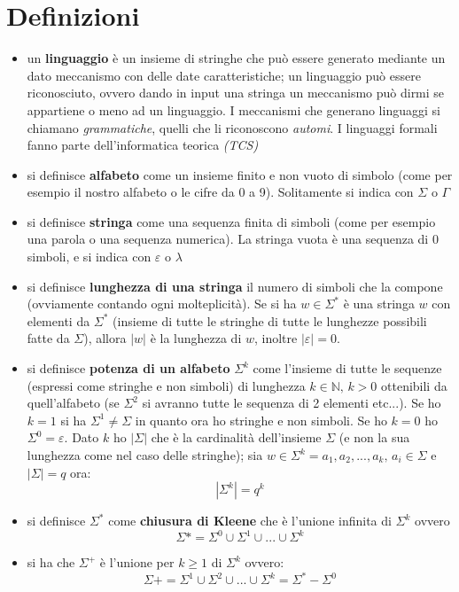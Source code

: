 \documentclass[a4paper,12pt, oneside]{book}
\begin{document}
\section{Definizioni}
\begin{itemize}
\item un \textbf{linguaggio }è un insieme di stringhe che può essere generato mediante un dato meccanismo con delle date caratteristiche; un linguaggio può essere riconosciuto, ovvero dando in input una stringa un meccanismo può dirmi se appartiene o meno ad un linguaggio. I meccanismi che generano linguaggi si chiamano \textit{grammatiche}, quelli che li riconoscono \textit{automi}. I linguaggi formali fanno parte dell'informatica teorica \textit{(TCS)}
\item si definisce \textbf{alfabeto} come un insieme finito e non vuoto di simbolo (come per esempio il nostro alfabeto o le cifre da 0 a 9). Solitamente si indica con $\Sigma$ o $\Gamma$
\item si definisce \textbf{stringa} come una sequenza finita di simboli (come per esempio una parola o una sequenza numerica). La stringa vuota è una sequenza di 0 simboli, e si indica con $\varepsilon$ o $\lambda$
\item si definisce \textbf{lunghezza di una stringa} il numero di simboli che la compone (ovviamente contando ogni molteplicità). Se si ha $w\in \Sigma^*$ è una stringa $w$ con elementi da $\Sigma^*$ (insieme di tutte le stringhe di tutte le lunghezze possibili fatte da $\Sigma$), allora $|w|$ è la lunghezza di $w$, inoltre $|\varepsilon|=0$.
\item si definisce \textbf{potenza di un alfabeto} $\Sigma^k$ come l'insieme di tutte le sequenze (espressi come stringhe e non simboli) di lunghezza $k\in\mathbb{N},\, k>0$ ottenibili da quell'alfabeto (se $\Sigma^2$ si avranno tutte le sequenza di 2 elementi etc...). Se ho $k=1$ si ha $\Sigma^1\neq \Sigma$ in quanto ora ho stringhe e non simboli. Se ho $k=0$ ho $\Sigma^0=\varepsilon$. Dato $k$ ho $|\Sigma|$ che è la cardinalità dell'insieme $\Sigma$ (e non la sua lunghezza come nel caso delle stringhe); sia $w\in\Sigma^k=a_1,a_2,...,a_k,\,a_i\in\Sigma$ e $|\Sigma|=q$ ora: $$|\Sigma^k|=q^k$$
\item si definisce $\Sigma^*$ come\textbf{ chiusura di Kleene} che è l'unione infinita di $\Sigma^k$ ovvero $$\Sigma*=\Sigma^0\cup \Sigma^1\cup...\cup \Sigma^k$$
\item si ha che $\Sigma^+$ è l'unione per $k\geq 1$ di $\Sigma^k$ ovvero:
$$\Sigma+=\Sigma^1\cup \Sigma^2\cup...\cup \Sigma^k= \Sigma^*-\Sigma^0$$

\end{itemize}
\end{document}
